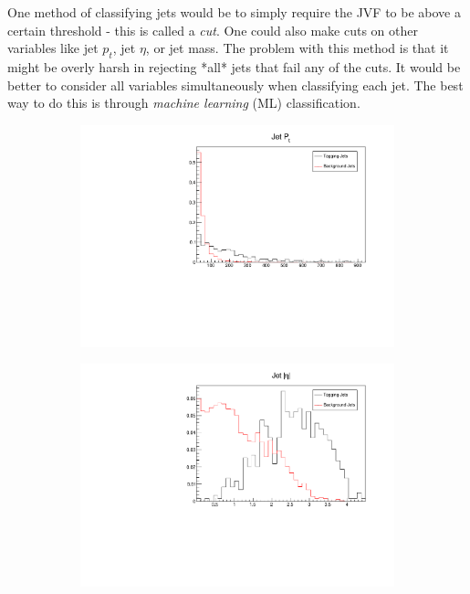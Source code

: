 \documentclass[10pt]{ucscthesisbs}
\begin{document}
One method of classifying jets would be to simply require the JVF to be above a certain threshold - this is called a \textit{cut}. One could also make cuts on other variables like jet $p_t$, jet $\eta$, or jet mass. The problem with this method is that it might be overly harsh in rejecting *all* jets that fail any of the cuts. It would be better to consider all variables simultaneously when classifying each jet. The best way to do this is through \textit{machine learning} (ML) classification.

\begin{figure} \label{fig:jetvars}
	\centering
	\begin{subfigure}[b]{0.4\textwidth}
    	\includegraphics[width=\textwidth]{images/JetPT}
    \end{subfigure}
    \begin{subfigure}[b]{0.4\textwidth}
    	\includegraphics[width=\textwidth]{images/JetAbsEta}

\end{subfigure}
\end{figure}
\end{document}
